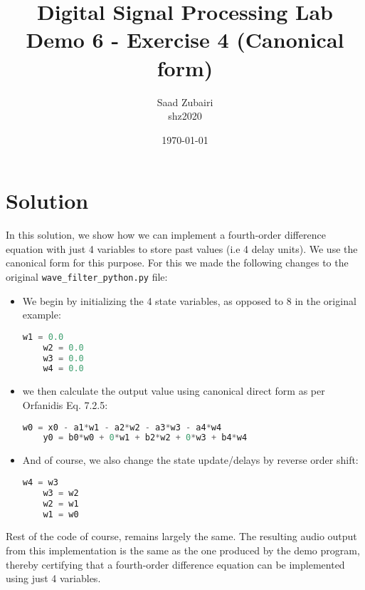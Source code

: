 \documentclass[11pt]{article}
\title{
    \vspace{3em}
    \textbf{Digital Signal Processing Lab}\\
    Demo 6 - Exercise 4 (Canonical form)
    \vspace{1em}
}
\author{
    Saad Zubairi \\ 
    shz2020 \\
    \vspace{1em}
}
\date{\today}
\begin{document}
\maketitle	

\pagebreak



\section*{Solution}

In this solution, we show how we can implement a fourth-order difference equation with just 4 variables to store past values (i.e 4 delay units). We use the canonical form for this purpose. For this we made the following changes to the original \texttt{wave\_filter\_python.py} file:


\begin{itemize}
    \item We begin by initializing the 4 state variables, as opposed to 8 in the original example:
    \begin{lstlisting}[language=python, label={lst:code}, breaklines=true, caption={Canonical States initialization}]   
    w1 = 0.0
    w2 = 0.0
    w3 = 0.0
    w4 = 0.0
    \end{lstlisting}    
    \item we then calculate the output value using canonical direct form as per Orfanidis Eq. 7.2.5:
    \begin{lstlisting}[language=python, label={lst:code}, breaklines=true, caption={Canonical (Direct Form II)}]   
    w0 = x0 - a1*w1 - a2*w2 - a3*w3 - a4*w4
    y0 = b0*w0 + 0*w1 + b2*w2 + 0*w3 + b4*w4
    \end{lstlisting}    
    \item And of course, we also change the state update/delays by reverse order shift:
    \begin{lstlisting}[language=python, label={lst:code}, breaklines=true, caption={delays or state update (reverse-order shift)}]   
    w4 = w3
    w3 = w2
    w2 = w1
    w1 = w0
    \end{lstlisting}    
\end{itemize}

Rest of the code of course, remains largely the same. The resulting audio output from this implementation is the same as the one produced by the demo program, thereby certifying that a fourth-order difference equation can be implemented using just 4 variables.
\end{document}
